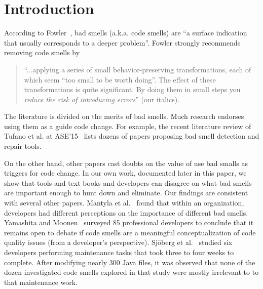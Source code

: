 \documentclass{sig-alternate}
\begin{document}
\section{Introduction}






\noindent
According to   Fowler~\cite{fowler99}, bad smells (a.k.a. code smells)
are ``a surface indication that usually corresponds to a deeper problem''.
Fowler strongly recommends   removing   code smells   by
\begin{quote}
``...applying a series of small behavior-preserving transformations, each 
of which seem ``too small to be worth doing''. 
The  effect of   these transformations is quite significant. By doing them in small steps you {\em reduce the risk of introducing errors}'' (our italics).
\end{quote}
The literature is divided on the merits of bad smells.
Much research  endorses using them as a guide
code change. For example,
the recent literature review of Tufano et al. at ASE'15~\cite{Tufano2015}  
lists dozens of  
papers proposing bad smell detection and repair tools. 

On the other hand, other papers cast doubts on the value of use bad smalls
as triggers for code change.
In our own work, documented later in this paper, we  show
that tools and text books and developers can disagree on what bad smells
are important enough to hunt down and eliminate. Our findings
are consistent with several other papers.
Mantyla et al.~\cite{Mantyla2004} found that within an organization,
 developers had different perceptions on the importance of different
 bad smells.    Yamashita  and Moonen~\cite{Yamashita2013}
 surveyed 85 professional developers to conclude that it remains
 open to debate if code smells are a meaningful conceptualization  of code quality issues (from a developer's perspective). 
 Sj\"oberg et al.~\cite{Sjoberg2013} studied six developers 
 performing maintenance tasks that took three to four weeks to complete. 
 After modifying nearly 300 Java files, it was observed
 that none of the dozen investigated code smells explored in 
 that study were mostly irrelevant to to that maintenance work.
 
\end{document}
